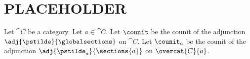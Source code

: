 \section{PLACEHOLDER}%

Let $\cat{C}$ be a category.
Let $a\in \cat{C}$.
Let $\counit$ be the counit of the adjunction $\adj{\pstilde}{\globalsections}$ on $\cat{C}$.
Let $\counit_a$ be the counit of the adjunction $\adj{\pstilde_a}{\sections{a}}$ on $\overcat{C}{a}$.



